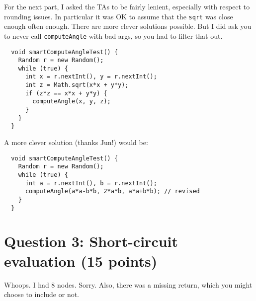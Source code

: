 \documentclass[12pt]{article}
\begin{document}
For the next part, I asked the TAs to be fairly lenient, especially with
respect to rounding issues. In particular it was OK to assume that the 
{\tt sqrt} was close enough often enough. There are more clever solutions possible.
But I did ask you to never call {\tt computeAngle} with bad args, so you had
to filter that out.
\begin{lstlisting}
  void smartComputeAngleTest() {
    Random r = new Random();
    while (true) {
      int x = r.nextInt(), y = r.nextInt();
      int z = Math.sqrt(x*x + y*y);
      if (z*z == x*x + y*y) {
        computeAngle(x, y, z);
      }
    }
  }
\end{lstlisting}
A more clever solution (thanks Jun!) would be:
\begin{lstlisting}
  void smartComputeAngleTest() {
    Random r = new Random();
    while (true) {
      int a = r.nextInt(), b = r.nextInt();
      computeAngle(a*a-b*b, 2*a*b, a*a+b*b); // revised
    }
  }
\end{lstlisting}

\newpage
\section*{Question 3: Short-circuit evaluation (15 points)}
Whoops. I had 8 nodes. Sorry. Also, there was a missing return, which you might choose to include or not.
\begin{center}
\end{center}
\end{document}
